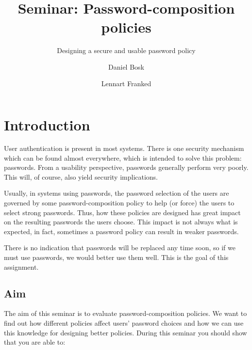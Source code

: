 \title{Seminar: Password-composition policies}
\subtitle{Designing a secure and usable password policy}

\author{%
  Daniel Bosk
  \and
  Lennart Franked
}

\maketitle

\begin{abstract}
  
\end{abstract}


\section{Introduction}%
\label{sec:intro}

User authentication is present in most systems.
There is one security mechanism which can be found almost everywhere, which is 
intended to solve this problem: passwords.
From a usability perspective, passwords generally perform very poorly.
This will, of course, also yield security implications.

Usually, in systems using passwords, the password selection of the users are 
governed by some password-composition policy to help (or force) the users to 
select strong passwords.
Thus, how these policies are designed has great impact on the resulting 
passwords the users choose.
This impact is not always what is expected, in fact, sometimes a password 
policy can result in weaker passwords.

There is no indication that passwords will be replaced any time soon, so if we 
must use passwords, we would better use them well.
This is the goal of this assignment.

\subsection{Aim}%
\label{sec:Syfte}

The aim of this seminar is to evaluate password-composition policies.
We want to find out how different policies affect users' password choices and 
how we can use this knowledge for designing better policies.
During this seminar you should show that you are able to:
\begin{itemize}
	
\end{itemize}


